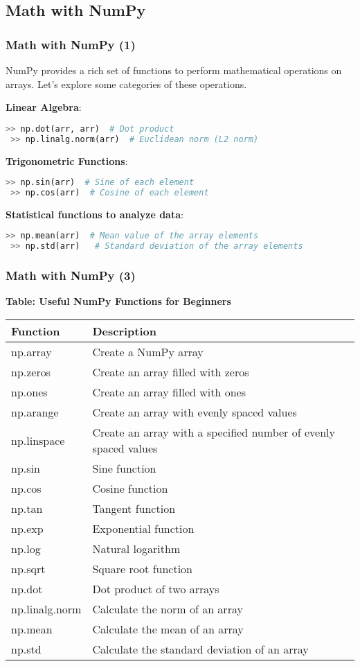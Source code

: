\subsection*{Math with NumPy}
\begin{frame}[fragile]
  \frametitle{Math with NumPy (1)}
  NumPy provides a rich set of functions to perform mathematical operations on arrays. Let's explore some categories of these operations.\pause

  \textbf{Linear Algebra}:
  \begin{lstlisting}[language=Python]
 >> np.dot(arr, arr)  # Dot product
 >> np.linalg.norm(arr)  # Euclidean norm (L2 norm)
  \end{lstlisting}\pause

  \textbf{Trigonometric Functions}:
  \begin{lstlisting}[language=Python]
 >> np.sin(arr)  # Sine of each element
 >> np.cos(arr)  # Cosine of each element
  \end{lstlisting}

  \textbf{Statistical functions to analyze data}:
  \begin{lstlisting}[language=Python]
 >> np.mean(arr)  # Mean value of the array elements
 >> np.std(arr)   # Standard deviation of the array elements
  \end{lstlisting}\pause
\end{frame}

\begin{frame}[fragile]
  \frametitle{Math with NumPy (3)}
  \textbf{Table: Useful NumPy Functions for Beginners}

  \begin{tabular}{l|l}
  Function & Description \\
  \hline
  np.array & Create a NumPy array \\
  np.zeros & Create an array filled with zeros \\
  np.ones & Create an array filled with ones \\
  np.arange & Create an array with evenly spaced values \\
  np.linspace & Create an array with a specified number of evenly spaced values \\
  np.sin & Sine function \\
  np.cos & Cosine function \\
  np.tan & Tangent function \\
  np.exp & Exponential function \\
  np.log & Natural logarithm \\
  np.sqrt & Square root function \\
  np.dot & Dot product of two arrays \\
  np.linalg.norm & Calculate the norm of an array \\
  np.mean & Calculate the mean of an array \\
  np.std & Calculate the standard deviation of an array \\
  \end{tabular}
\end{frame}


